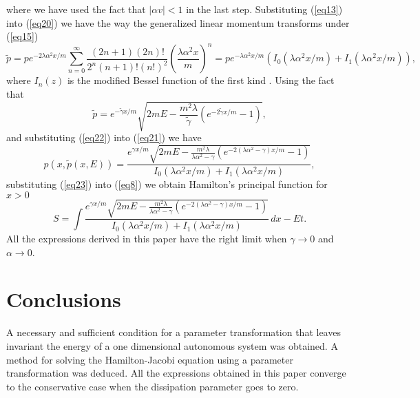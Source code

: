 where we have used the fact that $|\alpha v|<1$ in the last step.
Substituting (\ref{eq13}) into (\ref{eq20}) we have the way the
generalized linear momentum transforms under (\ref{eq15})
\begin{equation}
\tilde{p}=pe^{-2\lambda\alpha^2 x/m}\sum_{n=0}^\infty
\frac{(2n+1)(2n)!}{2^{n}(n+1)!(n!)^2}\left(\frac{\lambda\alpha^2
x}{m} \right)^{n}=pe^{-\lambda\alpha^2 x/m}\left(
I_{0}(\lambda\alpha^2 x/m)+I_{1}(\lambda\alpha^2 x/m)
\right),\label{eq21}
\end{equation}
where $I_{n}(z)$ is the modified Bessel function of the first kind
\cite{A} . Using the fact that
\begin{equation}
\tilde{p}=e^{-\tilde{\gamma}x/m}\sqrt{2mE-\frac{m^2\lambda}{\tilde{\gamma}}
\left(e^{-2\tilde{\gamma}x/m}-1\right)}, \label{eq22}
\end{equation}
and substituting (\ref{eq22}) into (\ref{eq21}) we have
\begin{equation}
p(x,\tilde{p}(x,E))= \frac{e^{\gamma
x/m}\sqrt{2mE-\frac{m^2\lambda}{\lambda\alpha^2-\gamma}
\left(e^{-2(\lambda\alpha^2-\gamma)x/m}-1\right)}}{I_{0}(\lambda\alpha^2
x/m)+I_{1}(\lambda\alpha^2 x/m)},\label{eq23}
\end{equation}
substituting (\ref{eq23}) into (\ref{eq8}) we obtain Hamilton's
principal function for $x>0$
\begin{equation}
S=\int \frac{e^{\gamma
x/m}\sqrt{2mE-\frac{m^2\lambda}{\lambda\alpha^2-\gamma}
\left(e^{-2(\lambda\alpha^2-\gamma)x/m}-1\right)}}{I_{0}(\lambda\alpha^2
x/m)+I_{1}(\lambda\alpha^2 x/m)}\,dx-Et.\label{eq24}
\end{equation}
All the expressions derived in this paper have the right limit when
$\gamma\rightarrow 0$ and $\alpha \rightarrow 0$.  \\

\section{Conclusions}
A necessary and sufficient condition for a parameter
transformation that leaves invariant the energy of a one
dimensional autonomous system was obtained. A method for solving
the Hamilton-Jacobi equation using a parameter transformation was
deduced. All the expressions obtained in this paper converge to
the conservative case
when the dissipation parameter goes to zero. \\

~~~~~\\

